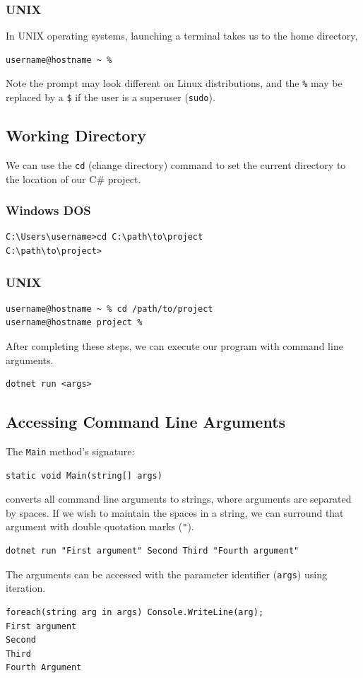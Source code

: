 \documentclass{article}
\def\customlinemarker#1#2{
    \edef\thelstnumber{%
        \unexpanded{%
            \ifnum#1=\value{lstnumber}\relax
              #2%
            \fi}%
        \ifx\thelstnumber\relax\else
        \expandafter\unexpanded\expandafter{\thelstnumber}%
        \fi
    }
}
\begin{document}
\subsubsection{UNIX}
In UNIX operating systems, launching a terminal takes us to the home directory,
\begin{lstlisting}[language=bash,numbers=none]
username@hostname ~ % 
\end{lstlisting}
Note the prompt may look different on Linux distributions, and the \lstinline|%| may be replaced by a \lstinline{$} if
the user is a superuser (\lstinline{sudo}).
\subsection{Working Directory}
We can use the \lstinline{cd} (change directory) command to
set the current directory to the location of our C\# project.
\subsubsection{Windows DOS}
\begin{lstlisting}[numbers=none]
C:\Users\username>cd C:\path\to\project
C:\path\to\project>
\end{lstlisting}
\subsubsection{UNIX}
\begin{lstlisting}[numbers=none]
username@hostname ~ % cd /path/to/project
username@hostname project %
\end{lstlisting}
After completing these steps, we can execute our program with command line arguments.
\begingroup
\let\thelstnumber\relax
\customlinemarker{1}{\$}
\begin{lstlisting}
dotnet run <args>
\end{lstlisting}
\endgroup
\subsection{Accessing Command Line Arguments}
The \lstinline{Main} method's signature:
\begin{lstlisting}[numbers=none]
static void Main(string[] args)
\end{lstlisting}
converts all command line arguments to strings,
where arguments are separated by spaces. If we wish to maintain the spaces
in a string, we can surround that argument with double quotation marks (\lstinline{"}). %
\begingroup
\let\thelstnumber\relax
\customlinemarker{1}{\$}
\begin{lstlisting}
dotnet run "First argument" Second Third "Fourth argument" 
\end{lstlisting}
\endgroup
The arguments can be accessed with the parameter identifier (\lstinline{args})
using iteration.
\begingroup
\let\thelstnumber\relax
\customlinemarker{1}{\$}
\begin{lstlisting}
foreach(string arg in args) Console.WriteLine(arg);
First argument
Second
Third
Fourth Argument
\end{lstlisting}
\endgroup
\end{document}
